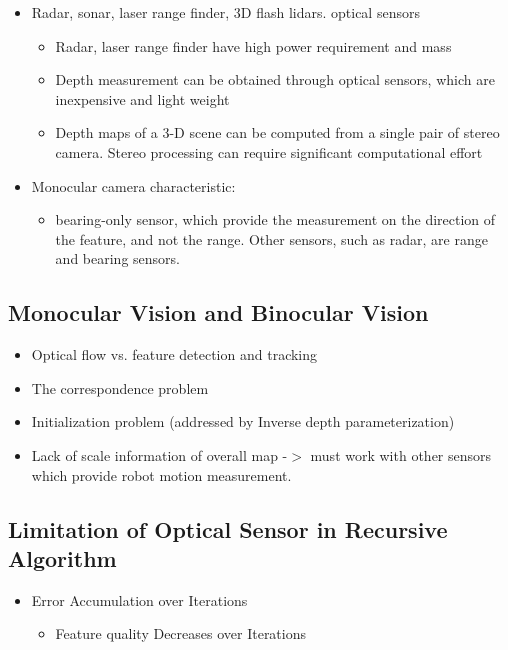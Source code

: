 \begin{itemize}
  \item Radar, sonar, laser range finder, 3D flash lidars. optical sensors
  \begin{itemize}
    \item Radar, laser range finder have high power requirement and mass
    \item Depth measurement can be obtained through optical sensors, which 
    are inexpensive and light weight
    \item Depth maps of a 3-D scene can be computed from a single pair of 
    stereo camera. Stereo processing can require significant computational 
    effort
  \end{itemize}
  \item Monocular camera characteristic: 
  \begin{itemize}
    \item bearing-only sensor, which provide the measurement on the 
    direction of the feature, and not the range. Other sensors, such as 
    radar, are range and bearing sensors. 
  \end{itemize}
\end{itemize}

\subsection{Monocular Vision and Binocular Vision}\label{sec:MonoBino}
\begin{itemize}
  \item Optical flow vs. feature detection and tracking
  \item The correspondence problem
  \item Initialization problem (addressed by Inverse depth 
  parameterization)
  \item Lack of scale information of overall map -$>$ must work with other 
  sensors which provide robot motion measurement. 
\end{itemize}

\subsection{Limitation of Optical Sensor in Recursive Algorithm}
\label{sec:OpticalSensorLimitation}

\begin{itemize}
  \item Error Accumulation over Iterations
  \begin{itemize}
    \item Feature quality Decreases over Iterations
  \end{itemize}
\end{itemize}

